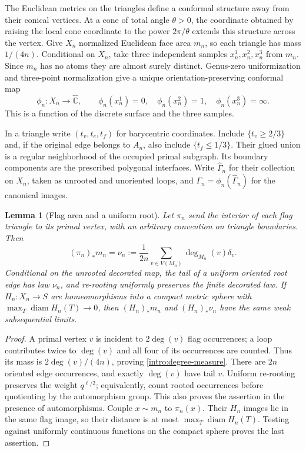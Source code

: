 \documentclass[11pt]{article}
\numberwithin{equation}{section}
\newtheorem{lemma}[theorem]{Lemma}
\theoremstyle{definition}
\theoremstyle{remark}
\newcommand{\Chat}{\widehat{\mathbb C}}
\newcommand{\1}{\mathbf 1}
\DeclareMathOperator{\diam}{diam}
\begin{document}
The Euclidean metrics on the triangles define a conformal structure
away from their conical vertices. At a cone of total angle $\theta>0$,
the coordinate obtained by raising the local cone coordinate to the
power $2\pi/\theta$ extends this structure across the vertex. Give
$X_n$ normalized Euclidean face area $m_n$, so each triangle has
mass $1/(4n)$. Conditional on $X_n$, take three independent samples
$x_n^1,x_n^2,x_n^3$ from $m_n$. Since $m_n$ has no atoms they are
almost surely distinct. Genus-zero uniformization
\cite[Theorem~II.2.15]{SaintGervais2016Uniformization} and three-point
normalization give a unique orientation-preserving conformal map
\[
 \phi_n:X_n\longrightarrow\Chat,
 \qquad
 \phi_n(x_n^1)=0,\quad\phi_n(x_n^2)=1,\quad
 \phi_n(x_n^3)=\infty.
\]
This is a function of the discrete surface and the three samples.

In a triangle write $(t_v,t_e,t_f)$ for barycentric coordinates.
Include $\{t_v\ge2/3\}$ and, if the original edge belongs to $A_n$,
also include $\{t_f\le1/3\}$. Their glued union is a regular
neighborhood of the occupied primal subgraph. Its boundary components
are the prescribed polygonal interfaces. Write $\widehat\Gamma_n$
for their collection on $X_n$, taken as unrooted and unoriented loops,
and $\Gamma_n=\phi_n(\widehat\Gamma_n)$ for the canonical images.

\begin{lemma}[Flag area and a uniform root]\label{intro:root-flag}
Let $\pi_n$ send the interior of each flag triangle to its primal
vertex, with an arbitrary convention on triangle boundaries. Then
\begin{equation}\label{intro:degree-measure}
 (\pi_n)_*m_n
 =\nu_n:=\frac1{2n}\sum_{v\in V(M_n)}\deg_{M_n}(v)\delta_v.
\end{equation}
Conditional on the unrooted decorated map, the tail of a uniform
oriented root edge has law $\nu_n$, and re-rooting uniformly preserves
the finite decorated law. If $H_n:X_n\to S$ are homeomorphisms into
a compact metric sphere with
$\max_T\diam H_n(T)\to0$, then $(H_n)_*m_n$ and
$(H_n)_*\nu_n$ have the same weak subsequential limits.
\end{lemma}

\begin{proof}
A primal vertex $v$ is incident to $2\deg(v)$ flag occurrences;
a loop contributes twice to $\deg(v)$ and all four of its occurrences
are counted. Thus its mass is $2\deg(v)/(4n)$, proving
\eqref{intro:degree-measure}. There are $2n$ oriented edge
occurrences, and exactly $\deg(v)$ have tail $v$. Uniform re-rooting
preserves the weight $q^{\ell/2}$; equivalently, count rooted
occurrences before quotienting by the automorphism group. This also
proves the assertion in the presence of automorphisms.
Couple $x\sim m_n$ to $\pi_n(x)$. Their $H_n$ images lie in the
same flag image, so their distance is at most
$\max_T\diam H_n(T)$. Testing against uniformly continuous
functions on the compact sphere proves the last assertion.
\end{proof}
\end{document}
